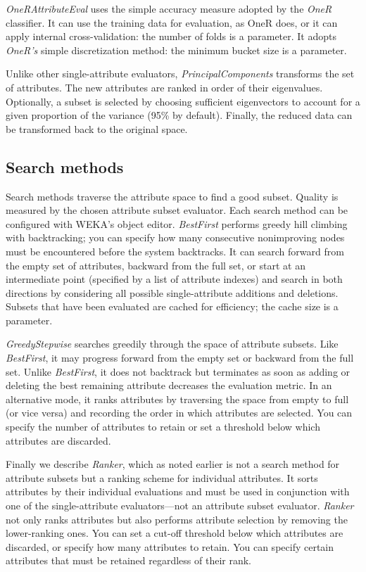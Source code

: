 \textit{OneRAttributeEval} uses the simple accuracy measure adopted by
the \textit{OneR} classifier. It can use the training data for
evaluation, as OneR does, or it can apply internal cross-validation:
the number of folds is a parameter. It adopts \textit{OneR's} simple
discretization method: the minimum bucket size is a parameter.

Unlike other single-attribute evaluators, \textit{PrincipalComponents}
transforms the set of attributes. The new attributes are ranked in
order of their eigenvalues. Optionally, a subset is selected by
choosing sufficient eigenvectors to account for a given proportion of
the variance (95\% by default). Finally, the reduced data can be
transformed back to the original space.

\subsection{Search methods}

Search methods traverse the attribute space to find a good
subset. Quality is measured by the chosen attribute subset
evaluator. Each search method can be configured with WEKA's object
editor. \textit{BestFirst} performs greedy hill climbing with
backtracking; you can specify how many consecutive nonimproving nodes
must be encountered before the system backtracks. It can search
forward from the empty set of attributes, backward from the full set,
or start at an intermediate point (specified by a list of attribute
indexes) and search in both directions by considering all possible
single-attribute additions and deletions. Subsets that have been
evaluated are cached for efficiency; the cache size is a parameter.

\textit{GreedyStepwise} searches greedily through the space of
attribute subsets. Like \textit{BestFirst}, it may progress forward
from the empty set or backward from the full set. Unlike
\textit{BestFirst}, it does not backtrack but terminates as soon as
adding or deleting the best remaining attribute decreases the
evaluation metric. In an alternative mode, it ranks attributes by
traversing the space from empty to full (or vice versa) and recording
the order in which attributes are selected. You can specify the number
of attributes to retain or set a threshold below which attributes are
discarded.

Finally we describe \textit{Ranker}, which as noted earlier is not a
search method for attribute subsets but a ranking scheme for
individual attributes. It sorts attributes by their individual
evaluations and must be used in conjunction with one of the
single-attribute evaluators---not an attribute subset
evaluator. \textit{Ranker} not only ranks attributes but also performs
attribute selection by removing the lower-ranking ones. You can set a
cut-off threshold below which attributes are discarded, or specify how
many attributes to retain. You can specify certain attributes that
must be retained regardless of their rank.

